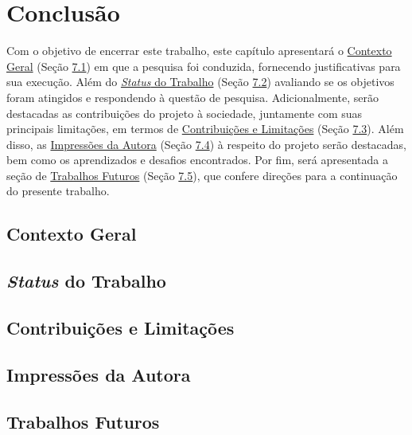 \chapter[Conclusão]{Conclusão}
\label{chap:Conclusão}
Com o objetivo de encerrar este trabalho, este capítulo apresentará o \hyperref[sec:Contexto Geral]{Contexto Geral} (Seção \hyperref[sec:Contexto Geral]{7.1}) 
em que a pesquisa foi conduzida, fornecendo justificativas para sua execução. Além do \hyperref[sec:Status do Trabalho]{\textit{Status} 
do Trabalho} (Seção \hyperref[sec:Status do Trabalho]{7.2}) avaliando se os objetivos foram atingidos e respondendo à questão de pesquisa. Adicionalmente, 
serão destacadas as contribuições do projeto à sociedade, juntamente com suas principais limitações, em termos de 
\hyperref[sec:Contribuições e Limitações]{Contribuições e Limitações} (Seção \hyperref[sec:Contexto Geral]{7.3}). Além disso, as \hyperref[sec:Impressões da Autora]{Impressões da Autora} 
(Seção \hyperref[sec:Impressões da Autora]{7.4}) à respeito do projeto serão destacadas, bem como os aprendizados e desafios encontrados. Por fim, será apresentada a seção de 
\hyperref[sec:Trabalhos Futuros]{Trabalhos Futuros} (Seção \hyperref[sec:Trabalhos Futuros]{7.5}), 
que confere direções para a continuação do presente trabalho.

\section{Contexto Geral}
\label{sec:Contexto Geral}


\section{\textit{Status} do Trabalho}
\label{sec:Status do Trabalho}


\section{Contribuições e Limitações}
\label{sec:Contribuições e Limitações}

\section{Impressões da Autora}
\label{sec:Impressões da Autora}


\section{Trabalhos Futuros}
\label{sec:Trabalhos Futuros}
